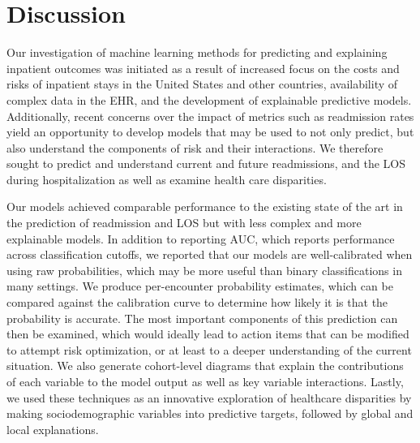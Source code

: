 \section{Discussion}

Our investigation of machine learning methods for predicting and explaining 
inpatient outcomes was initiated as a result of increased focus on 
the costs and risks of inpatient stays in the United States and other countries, 
availability of complex data in the EHR, 
and the development of explainable predictive models. 
Additionally, recent concerns over the impact of metrics such as readmission rates\supercite{Wadhera2018} 
yield an opportunity to develop models that may be used to not only predict, 
but also understand the components of risk and their interactions. 
We therefore sought to predict and understand current and future readmissions, 
and the LOS during hospitalization as well as examine health care disparities.

Our models achieved comparable performance to the existing state of the art 
in the prediction of readmission and LOS but with less complex and more explainable models.\supercite{Rajkomar2018, Artetxe2018}\@
In addition to reporting AUC, which reports performance across classification cutoffs, 
we reported that our models are well-calibrated when using raw probabilities, 
which may be more useful than binary classifications in many settings.\supercite{Steyerberg2010}
We produce per-encounter probability estimates, which can be compared against 
the calibration curve to determine how likely it is that the probability is accurate. 
The most important components of this prediction can then be examined, 
which would ideally lead to action items that can be modified to attempt risk optimization,\supercite{Donze2013, Leppin2014, Burke2017, Auerbach2016}
or at least to a deeper understanding of the current situation.\supercite{Saunders2015}
We also generate cohort-level diagrams that explain the contributions 
of each variable to the model output as well as key variable interactions. 
Lastly, we used these techniques as an innovative exploration of healthcare disparities 
by making sociodemographic variables into predictive targets, followed by global and local explanations.

